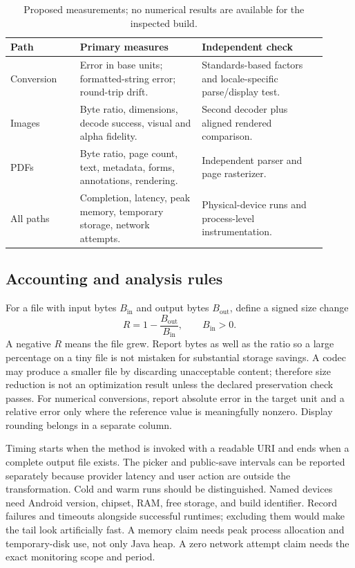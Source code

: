 \documentclass[10pt,letterpaper]{article}
\begin{document}
\begin{table}[H]
\centering\small
\caption{Proposed measurements; no numerical results are available for the inspected build.}
\label{tab:metrics}
\begin{tabular}{@{}>{\raggedright\arraybackslash}p{0.20\linewidth}>{\raggedright\arraybackslash}p{0.35\linewidth}>{\raggedright\arraybackslash}p{0.36\linewidth}@{}}
\toprule
Path & Primary measures & Independent check \\
\midrule
Conversion & Error in base units; formatted-string error; round-trip drift. & Standards-based factors and locale-specific parse/display test. \\
Images & Byte ratio, dimensions, decode success, visual and alpha fidelity. & Second decoder plus aligned rendered comparison. \\
PDFs & Byte ratio, page count, text, metadata, forms, annotations, rendering. & Independent parser and page rasterizer. \\
All paths & Completion, latency, peak memory, temporary storage, network attempts. & Physical-device runs and process-level instrumentation. \\
\bottomrule
\end{tabular}
\end{table}

\subsection{Accounting and analysis rules}

For a file with input bytes $B_{\mathrm{in}}$ and output bytes $B_{\mathrm{out}}$, define a signed size change
\begin{equation}
R=1-\frac{B_{\mathrm{out}}}{B_{\mathrm{in}}},\qquad B_{\mathrm{in}}>0.
\end{equation}
A negative $R$ means the file grew. Report bytes as well as the ratio so a large percentage on a tiny file is not mistaken for substantial storage savings. A codec may produce a smaller file by discarding unacceptable content; therefore size reduction is not an optimization result unless the declared preservation check passes. For numerical conversions, report absolute error in the target unit and a relative error only where the reference value is meaningfully nonzero. Display rounding belongs in a separate column.

Timing starts when the method is invoked with a readable URI and ends when a complete output file exists. The picker and public-save intervals can be reported separately because provider latency and user action are outside the transformation. Cold and warm runs should be distinguished. Named devices need Android version, chipset, RAM, free storage, and build identifier. Record failures and timeouts alongside successful runtimes; excluding them would make the tail look artificially fast. A memory claim needs peak process allocation and temporary-disk use, not only Java heap. A zero network attempt claim needs the exact monitoring scope and period.
\end{document}
